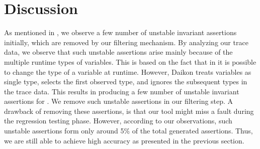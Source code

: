 \section{Discussion}
\label{Sec:discussion}

 As mentioned in , we observe a few number of unstable invariant assertions initially, which are removed by our filtering mechanism. By analyzing our trace data, we observe
that such unstable assertions arise mainly because of the 
multiple runtime types of \javascript variables.
This is based on the fact that in \javascript it is possible to change the type of a variable at runtime. However, Daikon treats variables as single type, selects the first observed type, and ignores the subsequent types in the trace data. This results in producing a few number of unstable invariant assertions for \javascript.
We remove such unstable assertions in our filtering step. A drawback of removing these assertions, is that our tool might miss a fault during the regression testing phase.
However, according to our observations, such unstable assertions form only around 5\% of the total generated assertions. Thus, we are still able to achieve high accuracy as presented in the previous section.
    
